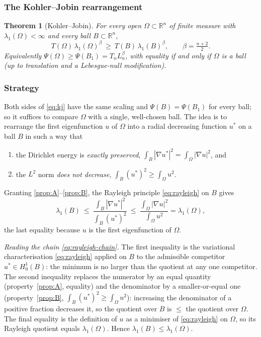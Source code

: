 \documentclass[11pt]{amsart}
\newtheorem{theorem}{Theorem}[section]
\theoremstyle{definition}
\newcommand{\R}{\mathbb R}
\newcommand{\Om}{\Omega}
\newcommand{\abs}[1]{\left|#1\right|}
\begin{document}
\subsubsection{The Kohler--Jobin rearrangement}
\label{ssec:kj-proof}

\begin{theorem}[Kohler--Jobin]\label{thm:kj}
For every open $\Om\subset\R^n$ of finite measure with $\lambda_1(\Om)<\infty$
and every ball $B\subset\R^n$,
\begin{equation}\label{eq:kj}
  T(\Om)\,\lambda_1(\Om)^{\beta}\ \ge\ T(B)\,\lambda_1(B)^{\beta},
  \qquad\beta=\tfrac{n+2}{2}.
\end{equation}
Equivalently $\Psi(\Om)\ge\Psi(B_1)=T_n L_n^{\beta}$, with equality if and
only if $\Om$ is a ball (up to translation and a Lebesgue-null modification).
\end{theorem}

\subsubsection*{Strategy}

Both sides of \eqref{eq:kj} have the same scaling and $\Psi(B)=\Psi(B_1)$
for every ball; so it suffices to compare $\Om$ with a single, well-chosen
ball. The idea is to rearrange the first eigenfunction $u$ of $\Om$ into a
radial decreasing function $u^*$ on a ball $B$ in such a way that
\begin{enumerate}[label=\textup{(\Alph*)}]
\item\label{prop:A} the Dirichlet energy is \emph{exactly preserved},
$\int_B\abs{\nabla u^*}^2=\int_\Om\abs{\nabla u}^2$, and
\item\label{prop:B} the $L^2$ norm \emph{does not decrease},
$\int_B(u^*)^2\ge\int_\Om u^2$.
\end{enumerate}
Granting \ref{prop:A}--\ref{prop:B}, the Rayleigh principle
\eqref{eq:rayleigh} on $B$ gives
\begin{equation}\label{eq:rayleigh-chain}
  \lambda_1(B)\ \le\
  \frac{\int_B\abs{\nabla u^*}^2}{\int_B(u^*)^2}
  \ \le\
  \frac{\int_\Om\abs{\nabla u}^2}{\int_\Om u^2}
  =\lambda_1(\Om),
\end{equation}
the last equality because $u$ is the first eigenfunction of $\Om$.

\emph{Reading the chain \eqref{eq:rayleigh-chain}.} The first inequality is
the variational characterisation \eqref{eq:rayleigh} applied on $B$ to the
admissible competitor $u^*\in H^1_0(B)$: the minimum is no larger than the
quotient at any one competitor. The second inequality replaces the
numerator by an equal quantity (property~\ref{prop:A}, equality) and the
denominator by a smaller-or-equal one (property~\ref{prop:B},
$\int_B(u^*)^2\ge\int_\Om u^2$): increasing the denominator of a positive
fraction decreases it, so the quotient over $B$ is $\le$ the quotient over
$\Om$. The final equality is the definition of $u$ as a minimiser of
\eqref{eq:rayleigh} on $\Om$, so its Rayleigh quotient equals
$\lambda_1(\Om)$. Hence $\lambda_1(B)\le\lambda_1(\Om)$.
\end{document}

